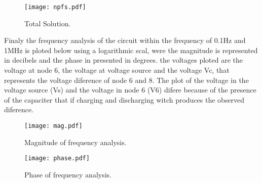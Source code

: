 \begin{figure}[ht] \centering
\texttt{[image: npfs.pdf]}
\caption{Total Solution.}
\label{Fig1: npfs}
\end{figure}

Finaly the frequency analysis of the circuit within the frequency of 0.1Hz and 1MHz is ploted below using a logarithmic scal, were the magnitude is represented in decibels and the phase in presented in degrees. the voltages ploted are the voltage at node 6, the voltage at voltage source and the voltage Vc, that represents the voltage diference of node 6 and 8. The plot of the voltage in the voltage source (Vs) and the voltage in node 6 (V6) difere because of the presence of the capaciter that if charging and discharging witch produces the observed diference.

\begin{figure}[ht] \centering
\texttt{[image: mag.pdf]}
\caption{Magnitude of frequency analysis.}
\label{Fig1: mag}
\end{figure}

\begin{figure}[ht] \centering
\texttt{[image: phase.pdf]}
\caption{Phase of frequency analysis.}
\label{Fig1: phase}
\end{figure}
